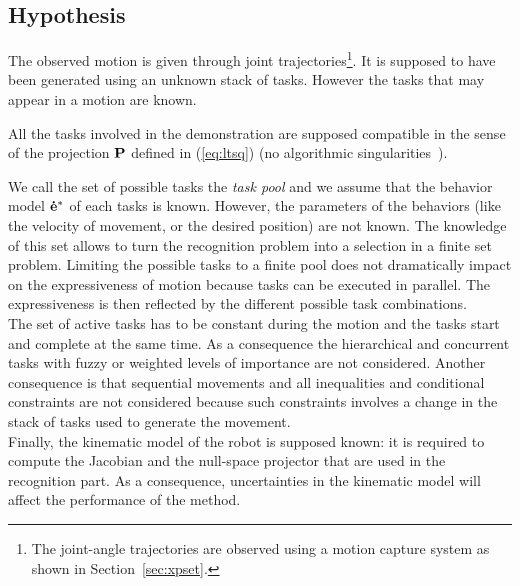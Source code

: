 \documentclass[journal]{IEEEtran}
\begin{document}
\subsection{Hypothesis}
The observed motion is given through
joint trajectories\footnote{The joint-angle trajectories are observed using a motion
capture system as shown in Section~\ref{sec:xpset}.}.
It is supposed to have been generated using an unknown stack of tasks.
However the tasks that may appear in a motion are known.

All the tasks involved in the demonstration are supposed compatible
in the sense of the projection ${\mathbf{P}}$ defined in (\ref{eq:ltsq})
(no algorithmic singularities~\cite{chiaverini97}).

We call the set of possible tasks the \emph{task pool} and we assume that the behavior model ${\mathbf{\dot{e}^*}}$ of each tasks is known.
However, the parameters of the behaviors (like the velocity of movement, or the desired
position) are not known. The knowledge of this set
allows to turn the recognition problem into a selection in a finite set problem.
Limiting the possible tasks to a finite pool does not dramatically
impact on the expressiveness of motion because tasks can be executed
in parallel. The expressiveness is then reflected by the different possible
task combinations.\\

The set of active tasks has to be constant during the motion and the tasks start and complete at the same time.
As a consequence the hierarchical and
concurrent tasks with fuzzy or weighted levels of importance are not considered.
Another consequence is that sequential movements and all inequalities and conditional constraints are not considered because
such constraints involves a change in the stack of tasks used to generate the movement.\\

Finally, the kinematic model of the robot is supposed known:
it is required to compute the Jacobian and the null-space projector that are used in the recognition part.
As a consequence, uncertainties in the kinematic model will affect the performance of the method.
\end{document}
